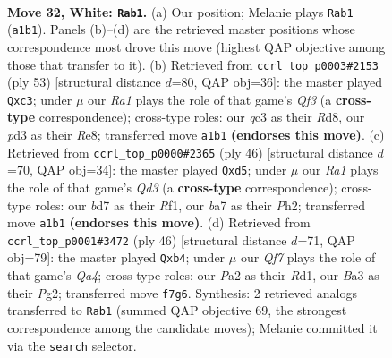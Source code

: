 \documentclass[11pt]{article}
\begin{document}
\clearpage

\begin{figure}[p]\centering
\begin{subfigure}{0.46\textwidth}\centering
\resizebox{\linewidth}{!}{%
\newchessgame
\chessboard[
  setfen={r2r3k/bp1b1Qp1/p3p3/7P/8/BPqp3B/P4PKP/R3R3 w - - 1 32},
  showmover=false,
  pgfstyle=straightmove, color=movearrow, markmove={a1-b1}
]}
\caption{}
\end{subfigure}\hfill
\begin{subfigure}{0.46\textwidth}\centering
\resizebox{\linewidth}{!}{%
\newchessgame
\chessboard[
  setfen={3rr1k1/pQ3p1p/Bp1P1qp1/5b2/5P2/2B5/P5PP/3R1R1K b - - 0 27},
  showmover=false,
  pgfstyle=straightmove, color=movearrow, markmove={f6-c3}
]}
\caption{}
\end{subfigure}
\\[4pt]
\begin{subfigure}{0.46\textwidth}\centering
\resizebox{\linewidth}{!}{%
\newchessgame
\chessboard[
  setfen={3rr1k1/pR3ppp/8/2bq4/8/3Q2P1/P4P1P/2B2RK1 w - - 0 24},
  showmover=false,
  pgfstyle=straightmove, color=movearrow, markmove={d3-d5}
]}
\caption{}
\end{subfigure}\hfill
\begin{subfigure}{0.46\textwidth}\centering
\resizebox{\linewidth}{!}{%
\newchessgame
\chessboard[
  setfen={2b2rk1/2rp2pp/1p2p3/8/QpP2q2/7P/3R1PP1/3R1BK1 w - - 0 24},
  showmover=false,
  pgfstyle=straightmove, color=movearrow, markmove={a4-b4}
]}
\caption{}
\end{subfigure}
\caption{\textbf{Move 32, White: \texttt{Rab1}.} (a) Our position; Melanie plays \texttt{Rab1} (\texttt{a1b1}). Panels (b)--(d) are the retrieved master positions whose correspondence most drove this move (highest QAP objective among those that transfer to it). (b) Retrieved from \texttt{ccrl\_top\_p0003\#2153} (ply 53) [structural distance $d$=80, QAP obj=36]: the master played \texttt{Qxc3}; under $\mu$ our \emph{Ra1} plays the role of that game's \emph{Qf3} (a \textbf{cross-type} correspondence); cross-type roles: our \emph{q}c3 as their \emph{R}d8, our \emph{p}d3 as their \emph{R}e8; transferred move \texttt{a1b1} \textbf{(endorses this move)}. (c) Retrieved from \texttt{ccrl\_top\_p0000\#2365} (ply 46) [structural distance $d$=70, QAP obj=34]: the master played \texttt{Qxd5}; under $\mu$ our \emph{Ra1} plays the role of that game's \emph{Qd3} (a \textbf{cross-type} correspondence); cross-type roles: our \emph{b}d7 as their \emph{R}f1, our \emph{b}a7 as their \emph{P}h2; transferred move \texttt{a1b1} \textbf{(endorses this move)}. (d) Retrieved from \texttt{ccrl\_top\_p0001\#3472} (ply 46) [structural distance $d$=71, QAP obj=79]: the master played \texttt{Qxb4}; under $\mu$ our \emph{Qf7} plays the role of that game's \emph{Qa4}; cross-type roles: our \emph{P}a2 as their \emph{R}d1, our \emph{B}a3 as their \emph{P}g2; transferred move \texttt{f7g6}. Synthesis: 2 retrieved analogs transferred to \texttt{Rab1} (summed QAP objective 69, the strongest correspondence among the candidate moves); Melanie committed it via the \texttt{search} selector.}
\label{fig:thought-m62}
\end{figure}
\end{document}

